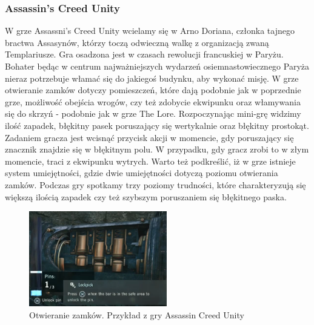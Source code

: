 \documentclass[oneside,polski,logo]{amuthesis}
\begin{document}
\subsubsection{Assassin's Creed Unity}
W grze Assassni's Creed Unity wcielamy się w Arno Doriana, członka tajnego bractwa Assasynów, którzy toczą odwieczną walkę z organizacją zwaną Templariusze. Gra osadzona jest w czasach rewolucji francuskiej w Paryżu. Bohater będąc w centrum najważniejszych wydarzeń osiemnastowiecznego Paryża nieraz potrzebuje włamać się do jakiegoś budynku, aby wykonać misję. W grze otwieranie zamków dotyczy pomieszczeń, które dają podobnie jak w poprzednie grze, możliwość obejścia wrogów, czy też zdobycie ekwipunku oraz włamywania się do skrzyń - podobnie jak w grze The Lore. Rozpoczynając mini-grę widzimy ilość zapadek, błękitny pasek poruszający się wertykalnie oraz błękitny prostokąt. Zadaniem gracza jest wcisnąć przycisk akcji w momencie, gdy poruszający się znacznik znajdzie się w błękitnym polu. W przypadku, gdy gracz zrobi to w złym momencie, traci z ekwipunku wytrych. Warto też podkreślić, iż w grze istnieje system umiejętności, gdzie dwie umiejętności dotyczą poziomu otwierania zamków. Podczas gry spotkamy trzy poziomy trudności, które charakteryzują się większą ilością zapadek czy też szybszym poruszaniem się błękitnego paska. \cite{acu}
\begin{figure}[h]
	\centering
	\includegraphics[width=6cm]{images/tyrek/acu.png}
	\caption{Otwieranie zamków. Przykład z gry Assassin Creed Unity}
\end{figure}
\end{document}
